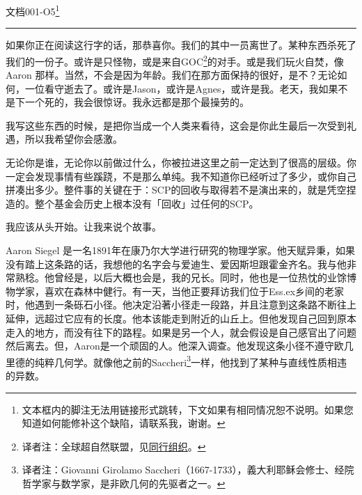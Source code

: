 \documentclass[openany,a4paper]{book} %
\begin{document}
\begin{colorboxed}

\vspace{12pt}

{\Large\color{red}文档001-O5}\footnote{文本框内的脚注无法用链接形式跳转，下文如果有相同情况恕不说明。如果您知道如何能修补这个缺陷，请联系我，谢谢。}\vspace{12pt}

\hrule\vspace{12pt}

如果你正在阅读这行字的话，那恭喜你。我们的其中一员离世了。某种东西杀死了我们的一份子。或许是只怪物，或是来自GOC\footnote{译者注：全球超自然联盟，见\hyperref[chap: 同行组织]{同行组织}。}的对手。或是我们玩火自焚，像Aaron 那样。当然，不会是因为年龄。我们在那方面保持的很好，是不？无论如何，一位看守逝去了。或许是Jason，或许是Agnes，或许是我。老天，我如果不是下一个死的，我会很惊讶。我永远都是那个最操劳的。\vspace{12pt}

我写这些东西的时候，是把你当成一个人类来看待，这会是你此生最后一次受到礼遇，所以我希望你会感激。\vspace{12pt}

无论你是谁，无论你以前做过什么，你被拉进这里之前一定达到了很高的层级。你一定会发现事情有些蹊跷，不是那么单纯。我不知道你已经听过了多少，或你自己拼凑出多少。整件事的关键在于：SCP的回收与取得若不是演出来的，就是凭空捏造的。整个基金会历史上根本没有「回收」过任何的SCP。\vspace{12pt}

我应该从头开始。让我来说个故事。\vspace{12pt}

Aaron Siegel 是一名1891年在康乃尔大学进行研究的物理学家。他天赋异秉，如果没有踏上这条路的话，我想他的名字会与爱迪生、爱因斯坦跟霍金齐名。我与他非常熟稔。他曾经是，以后大概也会是，我的兄长。同时，他也是一位热忱的业馀博物学家，喜欢在森林中健行。有一天，当他正要拜访我们位于Ess.ex乡间的老家时，他遇到一条砾石小径。他决定沿著小径走一段路，并且注意到这条路不断往上延伸，远超过它应有的长度。他本该能走到附近的山丘上。但他发现自己回到原本走入的地方，而没有往下的路程。如果是另一个人，就会假设是自己感官出了问题然后离去。但，Aaron是一个顽固的人。他深入调查。他发现这条小径不遵守欧几里德的纯粹几何学。就像他之前的Saccheri\footnote{译者注：Giovanni Girolamo Saccheri（1667-1733），義大利耶稣会修士、经院哲学家与数学家，是非欧几何的先驱者之一。}一样，他找到了某种与直线性质相违的异数。\vspace{12pt}


\end{colorboxed}
\end{document}
